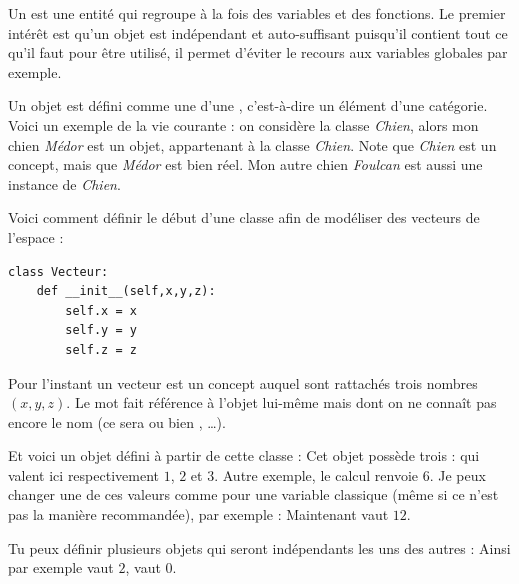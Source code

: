 \documentclass[11pt,class=report,crop=false]{standalone}
\begin{document}





\begin{cours}


Un  est une entité qui regroupe à la fois des variables et des fonctions.
Le premier intérêt est qu'un objet est indépendant et auto-suffisant 
puisqu'il contient tout ce qu'il faut pour être utilisé, il permet d'éviter le recours aux variables globales par exemple. 


Un objet est défini comme une  d'une , c'est-à-dire un élément d'une catégorie.
Voici un exemple de la vie courante : on considère la classe \emph{Chien}, alors mon chien \emph{Médor} est un objet, appartenant à la classe \emph{Chien}. Note que \emph{Chien} est un concept, mais que \emph{Médor} est bien réel.
Mon autre chien \emph{Foulcan} est aussi une instance de \emph{Chien}.

\medskip

Voici comment définir le début d'une classe  afin de modéliser des vecteurs de l'espace :
\begin{lstlisting}
class Vecteur:
    def __init__(self,x,y,z):
        self.x = x
        self.y = y
        self.z = z     
\end{lstlisting} 
Pour l'instant un vecteur est un concept auquel sont rattachés trois nombres $(x,y,z)$. Le mot  fait référence à l'objet lui-même mais dont on ne connaît pas encore le nom (ce sera  ou bien , \ldots).



Et voici un objet défini à partir de cette classe :
Cet objet possède trois  :
qui valent ici respectivement $1$, $2$ et $3$. Autre exemple, le calcul  renvoie $6$.
Je peux changer une de ces valeurs comme pour une variable classique (même si ce n'est pas la manière recommandée), par exemple :
Maintenant   vaut $12$.



Tu peux définir plusieurs objets qui seront indépendants les uns des autres :
Ainsi par exemple  vaut $2$,  vaut $0$.

\end{cours}
 
\end{document}

